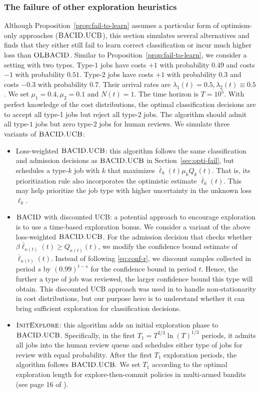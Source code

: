 \subsubsection{The failure of other exploration heuristics}\label{app:sim-fail-to-learn}
Although Proposition~\ref{prop:fail-to-learn} assumes a particular form of optimism-only approaches ($\textsc{BACID.UCB}$), this section simulates several alternatives and finds that they either still fail to learn correct classification or incur much higher loss than $\textsc{OLBACID}$. 
Similar to Proposition~\ref{prop:fail-to-learn}, we consider a setting with two types. Type-$1$ jobs have costs $+1$ with probability $0.49$ and costs $-1$ with probability $0.51$. Type-$2$ jobs have costs $+1$ with probability $0.3$ and costs $-0.3$ with probability $0.7$. Their arrival rates are $\lambda_1(t) = 0.5, \lambda_2(t) \equiv 0.5$. We set $\mu_1 = 0.4, \mu_2 = 0.1$ and $N(t)=1$. The time horizon is $T = 10^5$. With perfect knowledge of the cost distributions, the optimal classification decisions are to accept all type-1 jobs but reject all type-2 jobs. The algorithm should admit all type-$1$ jobs but zero type-$2$ jobs for human reviews. We simulate three variants of $\textsc{BACID.UCB}$: 
\begin{itemize}
\item Loss-weighted $\textsc{BACID.UCB}$: this algorithm  follows the same classification and admission decisions as $\textsc{BACID.UCB}$ in Section~\ref{sec:opti-fail}, but schedules a type-$k$ job with $k$ that maximizes $\bar{\ell}_k(t)\mu_k Q_k(t).$ That is, its prioritization rule also incorporates the optimistic estimate $\bar{\ell}_k(t)$. This may help prioritize the job type with higher uncertainty in the unknown loss $\ell_k.$ 
\item $\textsc{BACID}$ with discounted UCB: a potential approach to encourage exploration is to use a time-based exploration bonus. We consider a variant of the above loss-weighted $\textsc{BACID.UCB}$. For the admission decision  that checks whether $\beta \bar{\ell}_{\kappa(t)}(t)\geq Q_{\kappa(t)}(t)$, we modify the confidence bound estimate of $\bar{\ell}_{\kappa(t)}(t)$. Instead of following \eqref{eq:conf-r}, we discount samples collected in period $s$ by $(0.99)^{t-s}$ for the confidence bound in period $t$. Hence, the further a type of job was reviewed, the larger confidence bound this type will obtain. This discounted UCB approach was used in \cite{Avadhanula2022} to handle non-stationarity in cost distributions, but our purpose here is to understand whether it can bring sufficient exploration for classification decisions. 
\item $\textsc{InitExplore}$: this algorithm adds an initial exploration phase to $\textsc{BACID.UCB}$. Specifically, in the first $T_1 = T^{2/3}\ln(T)^{1/3}$ periods, it admits all jobs into the human review queue and schedules either type of jobs for review with equal probability. After the first $T_1$ exploration periods, the algorithm follows $\textsc{BACID.UCB}.$ We set $T_1$ according to the optimal exploration length for explore-then-commit policies in multi-armed bandits (see page 16 of \cite{slivkins2019introduction}).
\end{itemize}
